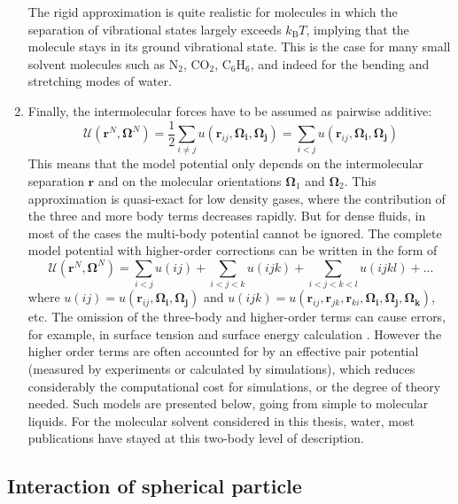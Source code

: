 \begin{enumerate}
The rigid approximation is quite realistic for molecules in which
the separation of vibrational states largely exceeds $k_{\mathrm{B}}T$,
implying that the molecule stays in its ground vibrational state.
This is the case for many small solvent molecules such as $\mathrm{N_{2}}$,
$\mathrm{CO_{2}}$, $\mathrm{C_{6}H_{6}}$, and indeed for the bending
and stretching modes of water. 
\item Finally, the intermolecular forces have to be assumed as pairwise
additive:
\begin{equation}
\mathcal{U}(\mathbf{r}^{N},\mathbf{\Omega}^{N})=\frac{1}{2}\sum_{i\neq j}u(\mathbf{r}_{ij},\mathbf{\Omega_{i}},\mathbf{\Omega_{j}})=\sum_{i<j}u(\mathbf{r}_{ij},\mathbf{\Omega_{i}},\mathbf{\Omega_{j}})\label{eq:pair-potential}
\end{equation}
This means that the model potential only depends on the intermolecular
separation $\mathbf{r}$ and on the molecular orientations $\mathbf{\Omega}_{1}$
and $\mathbf{\Omega}_{2}$. This approximation is quasi-exact for
low density gases, where the contribution of the three and more body
terms decreases rapidly. But for dense fluids, in most of the cases
the multi-body potential cannot be ignored. The complete model potential
with higher-order corrections can be written in the form of
\begin{equation}
\mathcal{U}(\mathbf{r}^{N},\mathbf{\Omega}^{N})=\sum_{i<j}u(ij)+\sum_{i<j<k}u(ijk)+\sum_{i<j<k<l}u(ijkl)+...
\end{equation}
where $u(ij)=u(\mathbf{r}_{ij},\mathbf{\Omega_{i}},\mathbf{\Omega_{j}})$
and $u(ijk)=u(\mathbf{r}_{ij},\mathbf{r}_{jk},\mathbf{r}_{ki},\mathbf{\Omega_{i}},\mathbf{\Omega_{j}},\mathbf{\Omega_{k}})$,
etc. The omission of the three-body and higher-order terms can cause
errors, for example, in surface tension and surface energy calculation
\citep{Miyazaki_1975}. However the higher order terms are often accounted
for by an effective pair potential (measured by experiments or calculated
by simulations), which reduces considerably the computational cost
for simulations, or the degree of theory needed. Such models are presented
below, going from simple to molecular liquids. For the molecular solvent
considered in this thesis, water, most publications have stayed at
this two-body level of description. 
\end{enumerate}

\subsection{Interaction of spherical particle}

